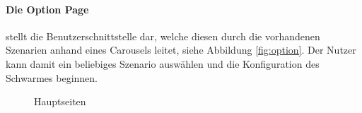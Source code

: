 \paragraph{Die Option Page} stellt die Benutzerschnittstelle dar, welche diesen durch die vorhandenen Szenarien anhand eines Carousels leitet, siehe Abbildung \eqref{fig:option}. Der Nutzer kann damit ein beliebiges Szenario auswählen und die Konfiguration des Schwarmes beginnen.\\

\bigskip

\begin{figure}[h]
	\centering
	\qquad
	\caption{Hauptseiten}
\end{figure}

